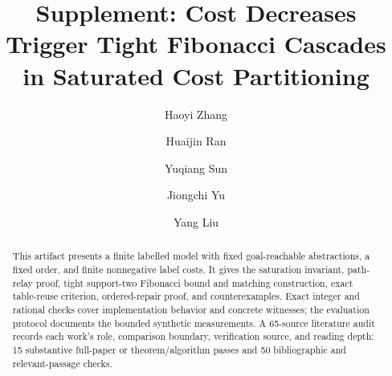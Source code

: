 \documentclass[preprint,11pt]{elsarticle}
\begin{document}
\begin{frontmatter}
\title{Supplement: Cost Decreases Trigger Tight Fibonacci Cascades\\in Saturated Cost Partitioning}
\author[xjtlu]{Haoyi Zhang}
\author[ntu]{Huaijin Ran}
\author[ntu]{Yuqiang Sun}
\author[ntu]{Jiongchi Yu}
\author[ntu]{Yang Liu}
\address[xjtlu]{Xi'an Jiaotong-Liverpool University, Suzhou, China}
\address[ntu]{Nanyang Technological University, Singapore}
\begin{abstract}
This artifact presents a finite labelled model with fixed goal-reachable abstractions, a fixed order, and finite nonnegative label costs. It gives the saturation invariant, path-relay proof, tight support-two Fibonacci bound and matching construction, exact table-reuse criterion, ordered-repair proof, and counterexamples. Exact integer and rational checks cover implementation behavior and concrete witnesses; the evaluation protocol documents the bounded synthetic measurements. A 65-source literature audit records each work's role, comparison boundary, verification source, and reading depth: 15 substantive full-paper or theorem/algorithm passes and 50 bibliographic and relevant-passage checks.
\end{abstract}
\end{frontmatter}





\end{document}

